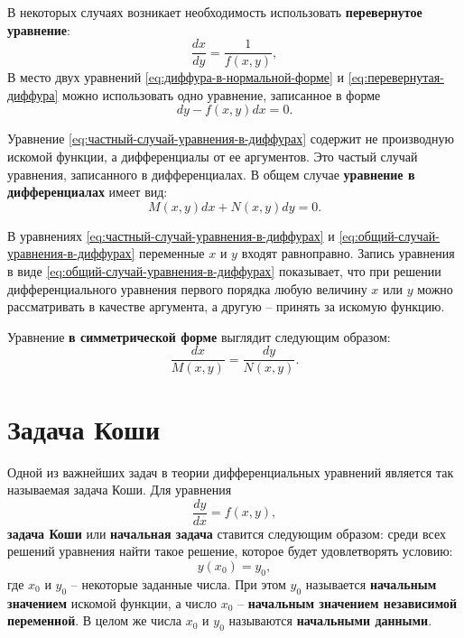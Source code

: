 \documentclass[a5paper, 11pt]{extbook}
\theoremstyle{definition}
\theoremstyle{definition}
\begin{document}
В некоторых случаях возникает необходимость использовать \textbf{перевернутое уравнение}:
\begin{equation}
    \label{eq:перевернутая-диффура}
    \frac{dx}{dy} = \frac{1}{f(x, y)},
\end{equation}
В место двух уравнений \eqref{eq:диффура-в-нормальной-форме} и \eqref{eq:перевернутая-диффура} можно использовать одно уравнение, записанное в форме
\begin{equation}
    \label{eq:частный-случай-уравнения-в-диффурах}
    dy - f(x, y)dx = 0.
\end{equation}

Уравнение \eqref{eq:частный-случай-уравнения-в-диффурах} содержит не производную искомой функции, а дифференциалы от ее аргументов. Это частый случай уравнения, записанного в дифференциалах. В общем случае \textbf{уравнение в дифференциалах} имеет вид:
\begin{equation}
    \label{eq:общий-случай-уравнения-в-диффурах}
    M(x, y) dx + N(x, y) dy = 0.
\end{equation}

В уравнениях \eqref{eq:частный-случай-уравнения-в-диффурах} и \eqref{eq:общий-случай-уравнения-в-диффурах} переменные \(x\) и \(y\) входят равноправно. Запись уравнения в виде \eqref{eq:общий-случай-уравнения-в-диффурах} показывает, что при решении дифференциального уравнения первого порядка любую величину \(x\) или \(y\) можно рассматривать в качестве аргумента, а другую -- принять за искомую функцию.

Уравнение \textbf{в симметрической форме} выглядит следующим образом:
\begin{equation}
    \frac{dx}{M(x, y)} = \frac{dy}{N(x, y)}.
\end{equation}

\section{Задача Коши}

Одной из важнейших задач в теории дифференциальных уравнений является так называемая задача Коши. Для уравнения
\begin{equation}
    \label{eq:уравнение-коши}
    \frac{dy}{dx} = f(x, y),
\end{equation}
\textbf{задача Коши} или \textbf{начальная задача} ставится следующим образом: среди всех решений уравнения найти такое решение, которое будет удовлетворять условию:
\begin{equation}
    y(x_0) = y_0,
\end{equation}
где \(x_0\) и \(y_0\) -- некоторые заданные числа. При этом \(y_0\) называется \textbf{начальным значением} искомой функции, а число \(x_0\) -- \textbf{начальным значением независимой переменной}. В целом же числа \(x_0\) и \(y_0\) называются \textbf{начальными данными}.
\end{document}
